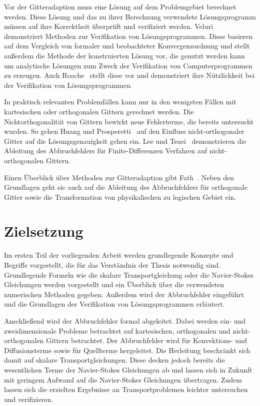 Vor der Gitteradaption muss eine Lösung auf dem Problemgebiet berechnet werden. Diese
Lösung und das zu ihrer Berechnung verwendete Lösungsprogramm müssen
auf ihre Korrektheit überprüft und verifiziert werden. Veluri~\cite{veluri} demonstriert
Methoden zur Verifikation von Lösungsprogrammen. Diese basieren auf dem Vergleich von formaler und beobachteter
Konvergenzordnung und stellt außerdem die Methode der konstruierten Lösung vor, die genutzt werden kann
um analytische Lösungen zum Zweck der Verifikation von Computerprogrammen zu erzeugen.
Auch Roache~\cite{roache} stellt diese vor und demonstriert ihre Nützlichkeit bei der Verifikation von
Lösungsprogrammen.

In praktisch relevanten Problemfällen kann nur in den wenigsten Fällen mit
kartesischen oder orthogonalen Gittern gerechnet werden. Die Nichtorthogonalität
von Gittern bewirkt neue Fehlerterme, die bereits untersucht wurden. So gehen
Huang und Prosperetti~\cite{grid_ortho} auf den Einfluss nicht-orthogonaler Gitter
auf die Lösungsgenauigkeit gehen 
ein. Lee und Tsuei~\cite{lee} demonstrieren die Ableitung des Abbruchfehlers für Finite-Differenzen Verfahren
auf nicht-orthogonalen Gittern.

Einen Überblick über Methoden zur Gitteradaption gibt Fath~\cite{fath}.
Neben den Grundlagen geht sie auch auf die Ableitung des Abbruchfehlers für
orthogonale Gitter sowie die Transformation von physikalischen zu logischen Gebiet ein.



\section{Zielsetzung}

Im ersten Teil der vorliegenden Arbeit werden grundlegende Konzepte und Begriffe vorgestellt,
die für das Verständnis der Thesis notwendig sind. Grundlegende Formeln wie
die skalare Transportgleichung oder die Navier-Stokes Gleichungen werden vorgestellt
und ein Überblick über die verwendeten numerischen Methoden gegeben. Außerdem
wird der Abbruchfehler eingeführt und die Grundlagen der Verifikation von
Lösungsprogrammen erläutert.

Anschließend wird der Abbruchfehler formal
abgeleitet. Dabei werden ein- und zweidimensionale Probleme betrachtet auf kartesischen, orthogonalen
und nicht-orthogonalen Gittern betrachtet. Der Abbruchfehler wird für Konvektions-
und Diffusionsterme sowie für Quellterme hergeleitet. Die Herleitung beschränkt sich damit auf
skalare Transportgleichungen. Diese decken jedoch bereits die wesentlichen Terme der Navier-Stokes Gleichungen
ab und lassen sich in Zukunft mit geringem Aufwand auf die Navier-Stokes Gleichungen übertragen.
Zudem lassen sich die erzielten Ergebnisse an Transportproblemen leichter untersuchen und verifizieren.

